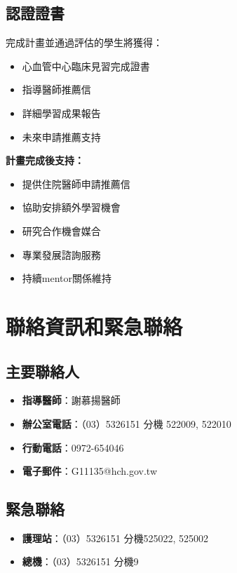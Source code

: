 \documentclass[12pt,a4paper]{article}
\begin{document}
\subsection{認證證書}
完成計畫並通過評估的學生將獲得：
\begin{itemize}[nosep]
    \item 心血管中心臨床見習完成證書
    \item 指導醫師推薦信
    \item 詳細學習成果報告
    \item 未來申請推薦支持
\end{itemize}

\begin{importantbox}
\textbf{計畫完成後支持：}
\begin{itemize}[nosep]
\item 提供住院醫師申請推薦信
\item 協助安排額外學習機會
\item 研究合作機會媒合
\item 專業發展諮詢服務
\item 持續mentor關係維持
\end{itemize}
\end{importantbox}

\section{聯絡資訊和緊急聯絡}

\subsection{主要聯絡人}
\begin{itemize}[nosep]
    \item \textbf{指導醫師}：謝慕揚醫師
    \item \textbf{辦公室電話}：（03）5326151 分機 522009, 522010
    \item \textbf{行動電話}：0972-654046
    \item \textbf{電子郵件}：G11135@hch.gov.tw
\end{itemize}

\subsection{緊急聯絡}
\begin{itemize}[nosep]
    \item \textbf{護理站}：（03）5326151 分機525022, 525002
    \item \textbf{總機}：（03）5326151 分機9
\end{itemize}
\end{document}
